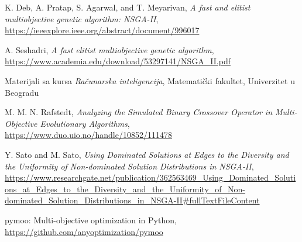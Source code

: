 \documentclass[12pt]{article}
\begin{document}
\renewcommand{\refname}{Literatura}
\begin{thebibliography}{10}

 K. Deb, A. Pratap, S. Agarwal, and T. Meyarivan, \textit{A fast and elitist multiobjective genetic algorithm: NSGA-II}, \url{https://ieeexplore.ieee.org/abstract/document/996017}

 A. Seshadri, \textit{A fast elitist multiobjective genetic algorithm}, \url{https://www.academia.edu/download/53297141/NSGA_II.pdf}

 Materijali sa kursa \textit{Računarska inteligencija}, Matematički fakultet, Univerzitet u Beogradu

 M. M. N. Rafstedt, \textit{Analyzing the Simulated Binary Crossover Operator in Multi-Objective Evolutionary Algorithms}, \url{https://www.duo.uio.no/handle/10852/111478}

 Y. Sato and M. Sato, \textit{Using Dominated Solutions at Edges to the Diversity and the Uniformity of Non‑dominated Solution Distributions in NSGA‑II}, \url{https://www.researchgate.net/publication/362563469_Using_Dominated_Solutions_at_Edges_to_the_Diversity_and_the_Uniformity_of_Non-dominated_Solution_Distributions_in_NSGA-II#fullTextFileContent}

 pymoo: Multi-objective optimization in Python, \url{https://github.com/anyoptimization/pymoo}


\end{thebibliography}
\end{document}
